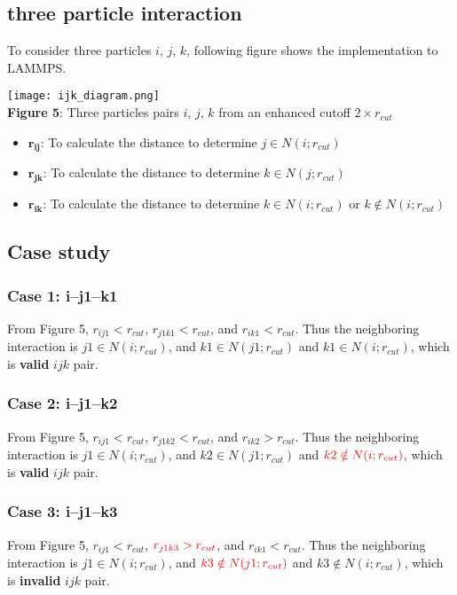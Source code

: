 \documentclass[11pt, oneside]{article}   	%
\begin{document}
  \subsection{three particle interaction}
 To consider three particles $i,\,j,\,k$, following figure shows the implementation to LAMMPS.
 \begin{center}
\texttt{[image: ijk\_diagram.png]} \\
\textbf{Figure 5}: Three particles pairs $i,\,j,\,k$ from an enhanced cutoff $2\times r_{cut}$ 
\end{center}
\begin{itemize}
\item{$\mathbf{r_{ij}}$: To calculate the distance to determine $j \in N(i;r_{cut})$}
\item{$\mathbf{r_{jk}}$: To calculate the distance to determine $k \in N(j;r_{cut})$}
\item{$\mathbf{r_{ik}}$: To calculate the distance to determine $k \in N(i;r_{cut})$ or $k \notin N(i;r_{cut})$}
\end{itemize}
\subsection{Case study}
\subsubsection{Case 1: i--j1--k1}
From Figure 5, $r_{ij1} < r_{cut}$, $r_{j1k1} < r_{cut}$, and $r_{ik1} < r_{cut}$. Thus the neighboring interaction is $j1 \in N(i;r_{cut})$, and $k1 \in N(j1;r_{cut})$ and $k1 \in N(i;r_{cut})$, which is \textbf{valid} $ijk$ pair.
\subsubsection{Case 2: i--j1--k2}
From Figure 5, $r_{ij1} < r_{cut}$, $r_{j1k2} < r_{cut}$, and $r_{ik2} > r_{cut}$. Thus the neighboring interaction is $j1 \in N(i;r_{cut})$, and $k2 \in N(j1;r_{cut})$ and $\color{red}k2 \notin N(i;r_{cut})$, which is \textbf{valid} $ijk$ pair.
\subsubsection{Case 3: i--j1--k3}
From Figure 5, $r_{ij1} < r_{cut}$, $\color{red} r_{j1k3} > r_{cut}$, and $r_{ik1} < r_{cut}$. Thus the neighboring interaction is $j1 \in N(i;r_{cut})$, and $\color{red} k3 \notin N(j1;r_{cut})$ and $k3 \notin N(i;r_{cut})$, which is {\color{red} \textbf{invalid}} $ijk$ pair.
\end{document}
